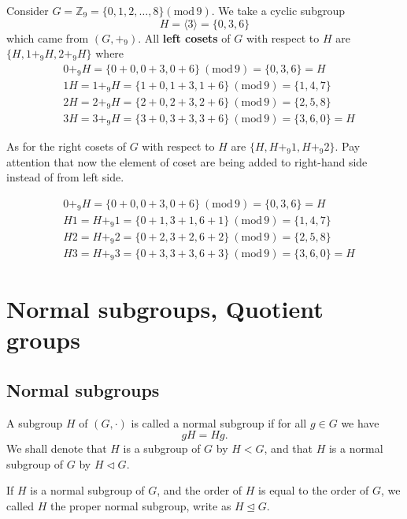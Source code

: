 \begin{example}
    Consider $G = \mathbb{Z}_9 = \{ 0, 1, 2, \ldots, 8 \} (\text{mod} \, 9)$. We take a cyclic subgroup 
    \[H = \langle 3 \rangle = \{0, 3, 6\}\] 
    which came from $(G, +_9)$. All \textbf{left cosets} of $G$ with respect to $H$ are $\{ H, 1 +_9 H, 2 +_9 H \}$ where
    \begin{align*}
        &0 +_9 H = \{0 + 0, 0+ 3, 0 + 6\} \> (\text{mod} \, 9) = \{0, 3, 6\} = H\\
        &1H = 1 +_9 H = \{1 + 0, 1 + 3, 1 + 6\} \> (\text{mod} \, 9) = \{1, 4, 7\}\\
        &2H = 2 +_9 H = \{2 + 0, 2 + 3, 2 + 6\} \> (\text{mod} \, 9) = \{2, 5, 8\}\\
        &3H = 3 +_9 H = \{3 + 0, 3 + 3, 3 + 6\} \> (\text{mod} \, 9) = \{3, 6, 0\} = H
    \end{align*}

    As for the right cosets of $G$ with respect to $H$ are $\{ H, H +_9 1, H +_9 2 \}$. Pay attention that now the element of coset are being 
    added to right-hand side instead of from left side.

    \begin{align*}
        &0 +_9 H = \{0 + 0, 0+ 3, 0 + 6\} \> (\text{mod} \, 9) = \{0, 3, 6\} = H\\
        &H1 = H +_9 1 = \{0 + 1, 3 + 1, 6 + 1\} \> (\text{mod} \, 9) = \{1, 4, 7\}\\
        &H2 = H +_9 2 = \{0 + 2, 3 + 2, 6 + 2\} \> (\text{mod} \, 9) = \{2, 5, 8\}\\
        &H3 = H +_9 3 = \{0 + 3, 3 + 3, 6 + 3\} \> (\text{mod} \, 9) = \{3, 6, 0\} = H
    \end{align*}
\end{example}

\section{Normal subgroups, Quotient groups}

\subsection{Normal subgroups}

\begin{definition}
    A subgroup $H$ of $(G, \cdot)$ is called a normal subgroup if for all $g \in G$ we have 
    \begin{equation}
        gH = Hg.
    \end{equation}
    We shall denote that $H$ is a subgroup of $G$ by $H < G$, and that $H$ is a normal subgroup of $G$ 
    by $H \vartriangleleft G$. 
    
    If $H$ is a normal subgroup of $G$, and the order of $H$ is equal to the order of $G$, we called $H$ the proper normal subgroup, write as $H \trianglelefteq G$. 
\end{definition}

